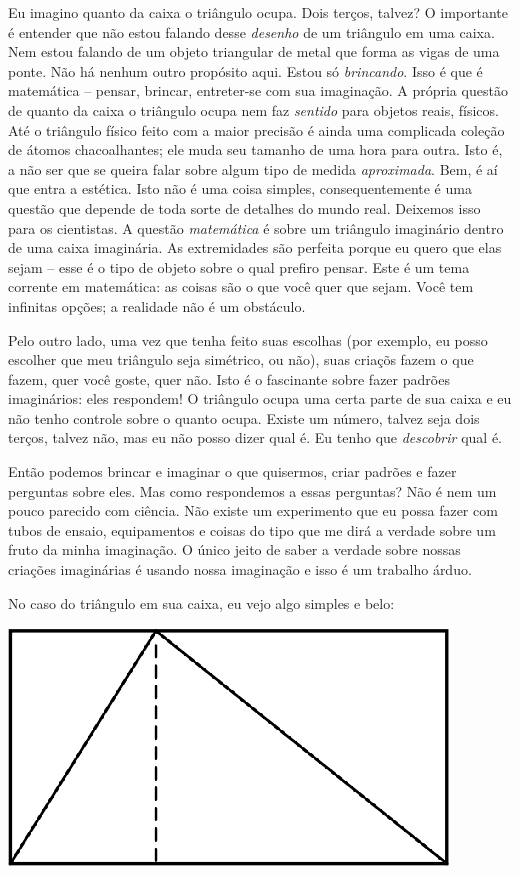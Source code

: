 \documentclass[a4paper,oneside,12pt,notitlepage]{article}
\begin{document}
Eu imagino quanto da caixa o triângulo ocupa.
Dois terços, talvez?
O importante é entender que não estou falando desse \textsl{desenho} de um triângulo em uma caixa.
Nem estou falando de um objeto triangular de metal que forma as vigas de uma ponte. %
Não há nenhum outro propósito aqui.
Estou só \textsl{brincando}.
Isso é que é matemática -- pensar, brincar, entreter-se com sua imaginação.
A própria questão de quanto da caixa o triângulo ocupa nem faz \textsl{sentido} para objetos reais, físicos.
Até o triângulo físico feito com a maior precisão é ainda uma complicada coleção de átomos chacoalhantes; ele muda seu tamanho de uma hora para outra.
Isto é, a não ser que se queira falar sobre algum tipo de medida \textsl{aproximada}.
Bem, é aí que entra a estética.
Isto não é uma coisa simples, consequentemente é uma questão que depende de toda sorte de detalhes do mundo real.
Deixemos isso para os cientistas.
A questão \textsl{matemática} é sobre um triângulo imaginário dentro de uma caixa imaginária.
As extremidades são perfeita porque eu quero que elas sejam -- esse é o tipo de objeto sobre o qual prefiro pensar.
Este é um tema corrente em matemática: as coisas são o que você quer que sejam.
Você tem infinitas opções; a realidade não é um obstáculo.

Pelo outro lado, uma vez que tenha feito suas escolhas (por exemplo, eu posso escolher que meu triângulo seja simétrico, ou não), suas criaçõs fazem o que fazem, quer você goste, quer não.
Isto é o fascinante sobre fazer padrões imaginários: eles respondem!
O triângulo ocupa uma certa parte de sua caixa e eu não tenho controle sobre o quanto ocupa.
Existe um número, talvez seja dois terços, talvez não, mas eu não posso dizer qual é.
Eu tenho que \textsl{descobrir} qual é.

Então podemos brincar e imaginar o que quisermos, criar padrões e fazer perguntas sobre eles.
Mas como respondemos a essas perguntas?
Não é nem um pouco parecido com ciência.
Não existe um experimento que eu possa fazer com tubos de ensaio, equipamentos e coisas do tipo que me dirá a verdade sobre um fruto da minha imaginação.
O único jeito de saber a verdade sobre nossas criações imaginárias é usando nossa imaginação e isso é um trabalho árduo.

No caso do triângulo em sua caixa, eu vejo algo simples e belo:

\begin{center}
\includegraphics{triangle1.eps}
\end{center}
\end{document}
